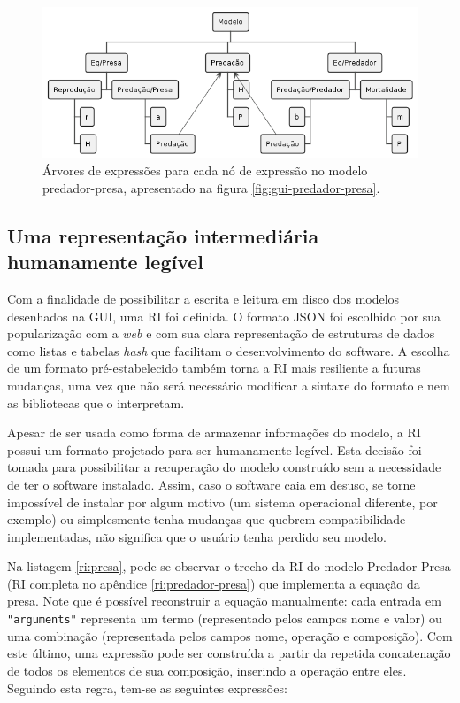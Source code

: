 \documentclass[
	12pt,				%
	openright,			%
	oneside,			%
	a4paper,			%
	main=brazil,
	english,			%
	]{ufsj-abntex2}
\begin{document}
\begin{figure}[h]
    \centering
    \includegraphics[scale=0.63]{diagrams/img/expr-tree.png} 
    \caption{Árvores de expressões para cada nó de expressão no modelo predador-presa, apresentado na figura \ref{fig:gui-predador-presa}.}
    \label{fig:expr-tree}
\end{figure}

\subsection{Uma representação intermediária humanamente legível}
\label{subsection:RI}

Com a finalidade de possibilitar a escrita e leitura em disco dos modelos desenhados na GUI, uma RI foi definida. O formato JSON foi escolhido por sua popularização com a \textit{web} e com sua clara representação de estruturas de dados como listas e tabelas \textit{hash} que facilitam o desenvolvimento do software. A escolha de um formato pré-estabelecido também torna a RI mais resiliente a futuras mudanças, uma vez que não será necessário modificar a sintaxe do formato e nem as bibliotecas que o interpretam.

Apesar de ser usada como forma de armazenar informações do modelo, a RI possui um formato projetado para ser humanamente legível. Esta decisão foi tomada para possibilitar a recuperação do modelo construído sem a necessidade de ter o software instalado. Assim, caso o software caia em desuso, se torne impossível de instalar por algum motivo (um sistema operacional diferente, por exemplo) ou simplesmente tenha mudanças que quebrem compatibilidade implementadas, não significa que o usuário tenha perdido seu 
modelo.

Na listagem \ref{ri:presa}, pode-se observar o trecho da RI do modelo Predador-Presa (RI completa no apêndice \ref{ri:predador-presa}) que implementa a equação da presa. Note que é possível reconstruir a equação manualmente: cada entrada em \texttt{"arguments"} representa um termo (representado pelos campos nome e valor) ou uma combinação (representada pelos campos nome, operação e composição). Com este último, uma expressão pode ser construída a partir da repetida concatenação de todos os elementos de sua composição, inserindo a operação entre eles. Seguindo esta regra, tem-se as seguintes expressões:
\end{document}
